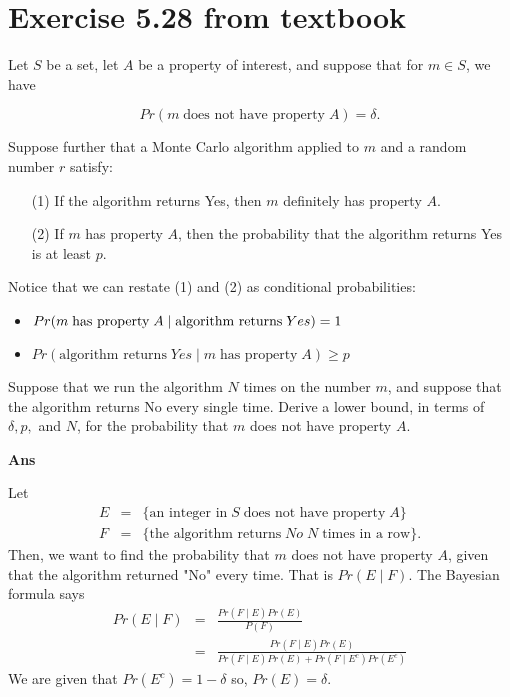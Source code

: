 \documentclass[12pt]{ut-thesis}
\theoremstyle{definition}
\begin{document}
	
	\section*{Exercise 5.28 from textbook}
	Let $S$ be a set, let $A$ be a property of interest, and suppose that for $m \in S$, we have

	\[Pr(m\; \text{does not have property}\; A) = \delta.\]
	
	Suppose further that a Monte Carlo algorithm applied to $m$ and a random number $r$ satisfy:
	
	\begin{itemize}
		\item[(1)] If the algorithm returns Yes, then $m$ definitely has property $A$.
		\item[(2)] If $m$ has property $A$, then the probability that the algorithm returns Yes is at least $p$.
	\end{itemize}
	Notice that we can restate (1) and (2) as conditional probabilities:
	
	\begin{itemize}
		\item $Pr(m\; \text{has property\;} A \;|\; \text{algorithm returns}\; Yes) = 1$
		\item $Pr(\text{algorithm returns}\; Yes \;|\; m\; \text{has property}\; A) \ge p$
	\end{itemize}
	
	Suppose that we run the algorithm $N$ times on the number $m$, and suppose that the algorithm returns No every single time. 
	Derive a lower bound, in terms of $\delta, p,$ and $N$, for the probability that $m$ does not have property $A$.

	\textbf{Ans}

	Let 
	\begin{eqnarray*}
		E &=& \{\text{an integer in}\; S\; \text{does not have property}\; A\}\\
		F &=& \{\text{the algorithm returns}\; No\; N\; \text{times in a row}\}.
	\end{eqnarray*}
	Then, we want to find the probability that $m$ does not have property $A$, 
	given that the algorithm returned "No" every time. That is 
	$Pr(E \;|\; F).$ The Bayesian formula says
	\begin{eqnarray}
		Pr(E \;|\; F) &=& \frac{Pr(F \;| \; E) Pr(E)}{P(F)}\nonumber\\
		&=& \frac{Pr(F \;| \; E) Pr(E)}{Pr(F \;|\; E)Pr(E) + Pr(F\; |\; E^c)Pr(E^c)}
	\end{eqnarray}
	We are given that  $Pr(E^c) = 1-\delta$ so, $Pr(E) = \delta$. 
	
\end{document}
